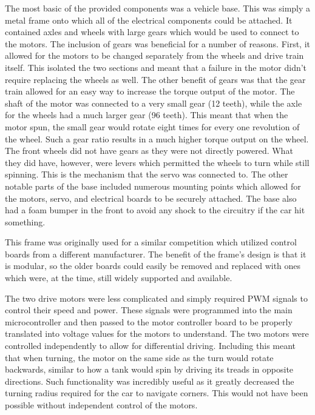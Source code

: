 \documentclass[conference]{IEEEtran}
\begin{document}
    The most basic of the provided components was a vehicle base. This was
    simply a metal frame onto which all of the electrical components could be
    attached. It contained axles and wheels with large gears which would be
    used to connect to the motors. The inclusion of gears was beneficial for
    a number of reasons. First, it allowed for the motors to be changed
    separately from the wheels and drive train itself. This isolated the two
    sections and meant that a failure in the motor didn't require replacing
    the wheels as well. The other benefit of gears was that the gear train
    allowed for an easy way to increase the torque output of the motor. The
    shaft of the motor was connected to a very small gear (12 teeth), while
    the axle for the wheels had a much larger gear (96 teeth). This meant that
    when the motor spun, the small gear would rotate eight times for every one
    revolution of the wheel. Such a gear ratio results in a much higher torque
    output on the wheel. The front wheels did not have gears as they were not
    directly powered. What they did have, however, were levers which permitted
    the wheels to turn while still spinning. This is the mechanism that the
    servo was connected to. The other notable parts of the base included
    numerous mounting points which allowed for the motors, servo, and
    electrical boards to be securely attached. The base also had a foam bumper
    in the front to avoid any shock to the circuitry if the car hit something.
    
    This frame was originally used for a similar competition which utilized
    control boards from a different manufacturer. The benefit of the frame's
    design is that it is modular, so the older boards could easily be removed
    and replaced with ones which were, at the time, still widely supported and
    available.

    The two drive motors were less complicated and simply required PWM signals
    to control their speed and power. These signals were programmed into the
    main microcontroller and then passed to the motor controller board to be
    properly translated into voltage values for the motors to understand. The
    two motors were controlled independently to allow for differential
    driving. Including this meant that when turning, the motor on the same
    side as the turn would rotate backwards, similar to how a tank would spin
    by driving its treads in opposite directions. Such functionality was
    incredibly useful as it greatly decreased the turning radius required for
    the car to navigate corners. This would not have been possible without
    independent control of the motors.
\end{document}
